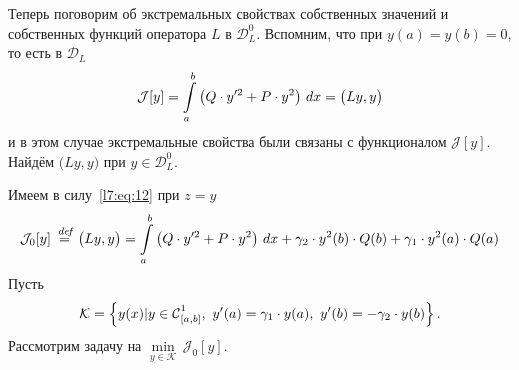\documentclass[12pt,a4paper,openany,fleqn]{book}
\newcommand {\defeq}{\stackrel{\hspace{0.09 cm}de\!f}{=}}
\newcommand {\eqdef}{\defeq}
\newcommand{\Cf}{\ensuremath{\mathcal{C}}}
\newcommand{\J}{\ensuremath{\mathcal{J}}}
\newcommand{\mc}[1]{\ensuremath{\mathcal{#1}}}
\newcommand{\Cfn}[2][]{\ensuremath{\Cf{\mathstrut}^{#2}_{#1}}}
\newcommand{\K}{\mc{K}}
\theoremstyle{definition}
\begin{document}
	Теперь поговорим об экстремальных свойствах собственных значений и собственных функций оператора $L$ в $\mc{D}_L^0$. Вспомним, что при $y(a)=y(b)=0$, то есть в $\mc{D}_L$ 
	\begin{equation*}
		\hfill\J[y]=\int\limits_a^b\left(Q\cdot y^{\prime2}+P\cdot y^2\right)\,dx=\big(Ly,y\big)\hfill
	\end{equation*} 
	и в этом случае экстремальные свойства были связаны с функционалом $\J[y]$. Найдём $\big(Ly,y\big)$ при $y\in\mc{D}_L^0$.
	
	Имеем в силу~\eqref{l7:eq:12} при $z=y$
	\begin{equation}
		\label{l7:eq:13}
		\hfill\J_0[y]\eqdef\big(Ly,y\big)=\int\limits_a^b\left(Q\cdot y^{\prime2}+P\cdot y^2\right)\,dx+\gamma_2\cdot y^2(b)\cdot Q(b)+\gamma_1\cdot y^2(a)\cdot Q(a)\hfill
	\end{equation} 
	Пусть
	\begin{equation*}
		\hfill\K=\left\{y(x)|y\in\Cfn[{[a,b]}]{1},\ y'(a)=\gamma_1\cdot y(a),\ y'(b)=-\gamma_2\cdot y(b) \right\}.\hfill
	\end{equation*}
	Рассмотрим задачу на $\displaystyle\min\limits_{y\in\K}\,\J_0[y]$. 
	
\end{document}
